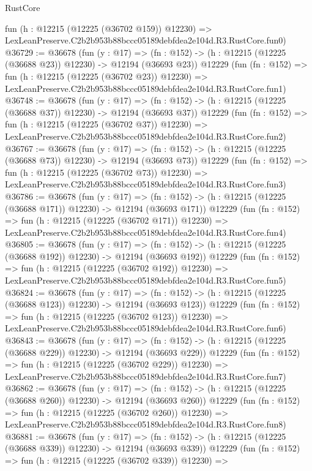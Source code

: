\begin{lexlean}{RustCore}
\begin{coremodule}
    fun (h : @12215 (@12225 (@36702 @159)) @12230) =>
    LexLeanPreserve.C2b2b953b88bccc05189debfdea2e104d.R3.RustCore.fun0)
@36729 := @36678
    (fun (y : @17) =>
    (fn : @152) -> (h : @12215 (@12225 (@36688 @23)) @12230) -> @12194 (@36693 @23))
    @12229
    (fun (fn : @152) =>
    fun (h : @12215 (@12225 (@36702 @23)) @12230) =>
    LexLeanPreserve.C2b2b953b88bccc05189debfdea2e104d.R3.RustCore.fun1)
@36748 := @36678
    (fun (y : @17) =>
    (fn : @152) -> (h : @12215 (@12225 (@36688 @37)) @12230) -> @12194 (@36693 @37))
    @12229
    (fun (fn : @152) =>
    fun (h : @12215 (@12225 (@36702 @37)) @12230) =>
    LexLeanPreserve.C2b2b953b88bccc05189debfdea2e104d.R3.RustCore.fun2)
@36767 := @36678
    (fun (y : @17) =>
    (fn : @152) -> (h : @12215 (@12225 (@36688 @73)) @12230) -> @12194 (@36693 @73))
    @12229
    (fun (fn : @152) =>
    fun (h : @12215 (@12225 (@36702 @73)) @12230) =>
    LexLeanPreserve.C2b2b953b88bccc05189debfdea2e104d.R3.RustCore.fun3)
@36786 := @36678
    (fun (y : @17) =>
    (fn : @152) -> (h : @12215 (@12225 (@36688 @171)) @12230) -> @12194 (@36693 @171))
    @12229
    (fun (fn : @152) =>
    fun (h : @12215 (@12225 (@36702 @171)) @12230) =>
    LexLeanPreserve.C2b2b953b88bccc05189debfdea2e104d.R3.RustCore.fun4)
@36805 := @36678
    (fun (y : @17) =>
    (fn : @152) -> (h : @12215 (@12225 (@36688 @192)) @12230) -> @12194 (@36693 @192))
    @12229
    (fun (fn : @152) =>
    fun (h : @12215 (@12225 (@36702 @192)) @12230) =>
    LexLeanPreserve.C2b2b953b88bccc05189debfdea2e104d.R3.RustCore.fun5)
@36824 := @36678
    (fun (y : @17) =>
    (fn : @152) -> (h : @12215 (@12225 (@36688 @123)) @12230) -> @12194 (@36693 @123))
    @12229
    (fun (fn : @152) =>
    fun (h : @12215 (@12225 (@36702 @123)) @12230) =>
    LexLeanPreserve.C2b2b953b88bccc05189debfdea2e104d.R3.RustCore.fun6)
@36843 := @36678
    (fun (y : @17) =>
    (fn : @152) -> (h : @12215 (@12225 (@36688 @229)) @12230) -> @12194 (@36693 @229))
    @12229
    (fun (fn : @152) =>
    fun (h : @12215 (@12225 (@36702 @229)) @12230) =>
    LexLeanPreserve.C2b2b953b88bccc05189debfdea2e104d.R3.RustCore.fun7)
@36862 := @36678
    (fun (y : @17) =>
    (fn : @152) -> (h : @12215 (@12225 (@36688 @260)) @12230) -> @12194 (@36693 @260))
    @12229
    (fun (fn : @152) =>
    fun (h : @12215 (@12225 (@36702 @260)) @12230) =>
    LexLeanPreserve.C2b2b953b88bccc05189debfdea2e104d.R3.RustCore.fun8)
@36881 := @36678
    (fun (y : @17) =>
    (fn : @152) -> (h : @12215 (@12225 (@36688 @339)) @12230) -> @12194 (@36693 @339))
    @12229
    (fun (fn : @152) =>
    fun (h : @12215 (@12225 (@36702 @339)) @12230) =>

\end{coremodule}
\end{lexlean}
